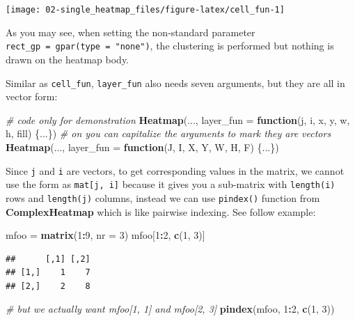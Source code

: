 \documentclass[]{book}
\newenvironment{Shaded}{\begin{snugshade}}{\end{snugshade}}
\newcommand{\KeywordTok}[1]{\textcolor[rgb]{0.13,0.29,0.53}{\textbf{#1}}}
\newcommand{\DataTypeTok}[1]{\textcolor[rgb]{0.13,0.29,0.53}{#1}}
\newcommand{\DecValTok}[1]{\textcolor[rgb]{0.00,0.00,0.81}{#1}}
\newcommand{\StringTok}[1]{\textcolor[rgb]{0.31,0.60,0.02}{#1}}
\newcommand{\CommentTok}[1]{\textcolor[rgb]{0.56,0.35,0.01}{\textit{#1}}}
\newcommand{\ControlFlowTok}[1]{\textcolor[rgb]{0.13,0.29,0.53}{\textbf{#1}}}
\newcommand{\OperatorTok}[1]{\textcolor[rgb]{0.81,0.36,0.00}{\textbf{#1}}}
\newcommand{\NormalTok}[1]{#1}
\theoremstyle{definition}
\theoremstyle{definition}
\theoremstyle{definition}
\theoremstyle{remark}
\begin{document}
\begin{center}\texttt{[image: 02-single\_heatmap\_files/figure-latex/cell\_fun-1]} \end{center}

As you may see, when setting the non-standard parameter
\texttt{rect\_gp\ =\ gpar(type\ =\ "none")}, the clustering is performed
but nothing is drawn on the heatmap body.

Similar as \texttt{cell\_fun}, \texttt{layer\_fun} also needs seven
arguments, but they are all in vector form:

\begin{Shaded}
\begin{Highlighting}[]
\CommentTok{# code only for demonstration}
\KeywordTok{Heatmap}\NormalTok{(..., }\DataTypeTok{layer_fun =} \ControlFlowTok{function}\NormalTok{(j, i, x, y, w, h, fill) \{...\})}
\CommentTok{# on you can capitalize the arguments to mark they are vectors}
\KeywordTok{Heatmap}\NormalTok{(..., }\DataTypeTok{layer_fun =} \ControlFlowTok{function}\NormalTok{(J, I, X, Y, W, H, F) \{...\})}
\end{Highlighting}
\end{Shaded}

Since \texttt{j} and \texttt{i} are vectors, to get corresponding values
in the matrix, we cannot use the form as \texttt{mat{[}j,\ i{]}} because
it gives you a sub-matrix with \texttt{length(i)} rows and
\texttt{length(j)} columns, instead we can use \texttt{pindex()}
function from \textbf{ComplexHeatmap} which is like pairwise indexing.
See follow example:

\begin{Shaded}
\begin{Highlighting}[]
\NormalTok{mfoo =}\StringTok{ }\KeywordTok{matrix}\NormalTok{(}\DecValTok{1}\OperatorTok{:}\DecValTok{9}\NormalTok{, }\DataTypeTok{nr =} \DecValTok{3}\NormalTok{)}
\NormalTok{mfoo[}\DecValTok{1}\OperatorTok{:}\DecValTok{2}\NormalTok{, }\KeywordTok{c}\NormalTok{(}\DecValTok{1}\NormalTok{, }\DecValTok{3}\NormalTok{)]}
\end{Highlighting}
\end{Shaded}

\begin{verbatim}
##      [,1] [,2]
## [1,]    1    7
## [2,]    2    8
\end{verbatim}

\begin{Shaded}
\begin{Highlighting}[]
\CommentTok{# but we actually want mfoo[1, 1] and mfoo[2, 3]}
\KeywordTok{pindex}\NormalTok{(mfoo, }\DecValTok{1}\OperatorTok{:}\DecValTok{2}\NormalTok{, }\KeywordTok{c}\NormalTok{(}\DecValTok{1}\NormalTok{, }\DecValTok{3}\NormalTok{))}
\end{Highlighting}
\end{Shaded}
\end{document}
